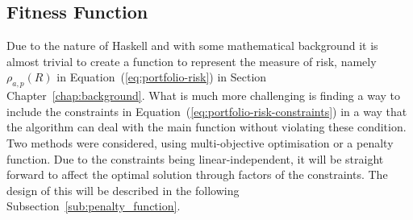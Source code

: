     \subsection{Fitness Function} %
    \label{sub:fitness_function}
    Due to the nature of Haskell and with some mathematical background it is almost trivial to create a function to represent the measure of risk, namely $\rho_{a,p}(R)$ in Equation~(\ref{eq:portfolio-risk}) in Section~ Chapter~\ref{chap:background}. What is much more challenging is finding a way to include the constraints in Equation~(\ref{eq:portfolio-risk-constraints}) in a way that the algorithm can deal with the main function without violating these condition. Two methods were considered, using multi-objective optimisation or a penalty function. Due to the constraints being linear-independent, it will be straight forward to affect the optimal solution through factors of the constraints. The design of this will be described in the following Subsection~\ref{sub:penalty_function}.
